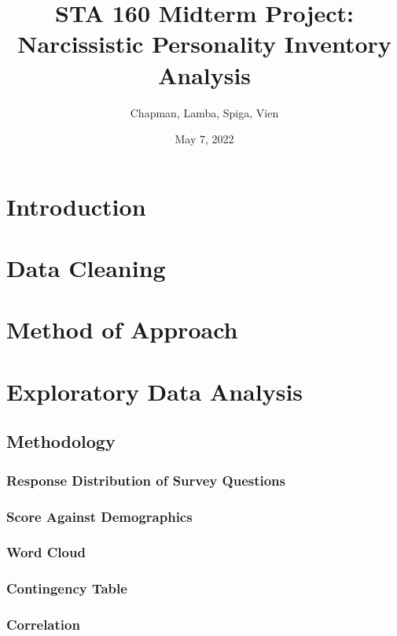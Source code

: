 \documentclass{article}
\title{STA 160 Midterm Project: Narcissistic Personality Inventory Analysis}
\author{Chapman, Lamba, Spiga, Vien}
\date{May 7, 2022}
\begin{document}
\maketitle
\tableofcontents
\pagebreak

\section{Introduction}

\section{Data Cleaning}

\section{Method of Approach}

\newpage
\section{Exploratory Data Analysis}

\subsection{Methodology}

\subsubsection{Response Distribution of Survey Questions}

\subsubsection{Score Against Demographics}

\subsubsection{Word Cloud}

\subsubsection{Contingency Table}

\subsubsection{Correlation}

\newpage
\end{document}

